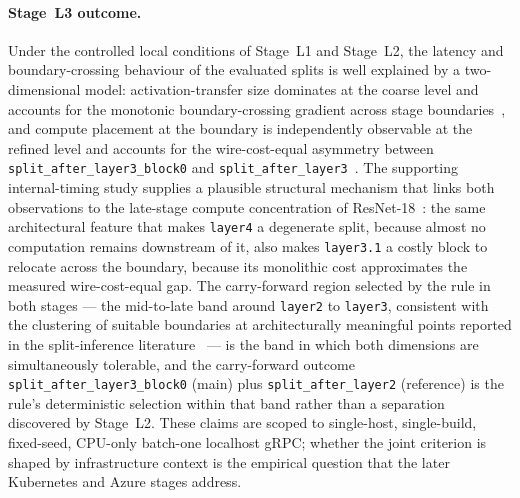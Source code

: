 \paragraph{Stage~L3 outcome.}
Under the controlled local conditions of Stage~L1 and Stage~L2, the latency
and boundary-crossing behaviour of the evaluated splits is well
explained by a two-dimensional model: activation-transfer size
dominates at the coarse level and accounts for the monotonic
boundary-crossing gradient across stage
boundaries~\cite{deeperthings}, and compute placement at the boundary
is independently observable at the refined level and accounts for the
wire-cost-equal asymmetry between \texttt{split\_after\_layer3\_block0}
and \texttt{split\_after\_layer3}~\cite{pareto_split}. The supporting
internal-timing study supplies a plausible structural mechanism that
links both observations to the late-stage compute concentration of
ResNet-18~\cite{resnet}: the same architectural feature that makes
\texttt{layer4} a degenerate split, because almost no computation
remains downstream of it, also makes \texttt{layer3.1} a costly block
to relocate across the boundary, because its monolithic cost
approximates the measured wire-cost-equal gap. The carry-forward
region selected by the rule in both stages --- the mid-to-late band
around \texttt{layer2} to \texttt{layer3}, consistent with the
clustering of suitable boundaries at architecturally meaningful points
reported in the split-inference literature~\cite{dnnsplit} --- is the
band in which both dimensions are simultaneously tolerable, and the
carry-forward outcome \texttt{split\_after\_layer3\_block0} (main)
plus \texttt{split\_after\_layer2} (reference) is the rule's
deterministic selection within that band rather than a separation
discovered by Stage~L2. These claims are scoped to single-host,
single-build, fixed-seed, CPU-only batch-one localhost gRPC; whether
the joint criterion is shaped by infrastructure context is the
empirical question that the later Kubernetes and Azure stages address.
